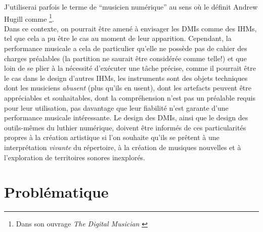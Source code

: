 \noindent J'utiliserai parfois le terme de ``musicien numérique'' au sens où le définit Andrew Hugill comme \footnote{Dans son ouvrage \textit{The Digital Musician} \cite{hugill_digital_2008}}.\\
\indent Dans ce contexte, on pourrait être amené à envisager les \glspl{DMI} comme des \glspl{IHM}, tel que cela a pu être le cas au moment de leur apparition. Cependant, la performance musicale a cela de particulier qu'elle ne possède pas de cahier des charges préalables (la partition ne saurait être considérée comme telle!) et que loin de se plier à la nécessité d'exécuter une tâche précise, comme il pourrait être le cas dans le design d'autres \glspl{IHM}, les instruments sont des objets techniques dont les musiciens \textit{abusent} (plus qu'ils en usent), dont les artefacts peuvent être appréciables et souhaitables, dont la compréhension n'est pas un préalable requis pour leur utilisation, pas davantage que leur fiabilité n'est garante d'une performance musicale intéressante. Le design des \glspl{DMI}, ainsi que le design des outils-mêmes du luthier numérique, doivent être informés de ces particularités propres à la création artistique si l'on souhaite qu'ils se prêtent à une interprétation \textit{vivante} du répertoire, à la création de musiques nouvelles et à l'exploration de territoires sonores inexplorés.


\section{Problématique}


